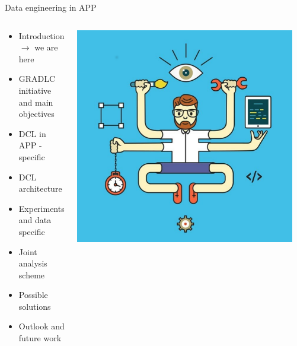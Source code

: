 \begin{frame}{Data engineering in APP}

\begin{columns}
    \begin{column}[t]{0.45\textwidth}
    \vspace{-14em}
        \begin{itemize}
        \item  Introduction \textcolor{kit-green100}{$\rightarrow$ we are here}
        \item  GRADLC initiative and main objectives
        \item  DCL in APP - specific
        \item  DCL architecture
        \item  Experiments and data specific
        \item  Joint analysis scheme
        \item  Possible solutions
        \item  Outlook and future work
        \end{itemize}
    \end{column}

    \begin{column}[t]{0.45\textwidth}
        \vspace{-2em}
        \includegraphics[width=0.95\textwidth]{pics/DE_fun.pdf}
    \end{column}
    \end{columns}
\end{frame}

